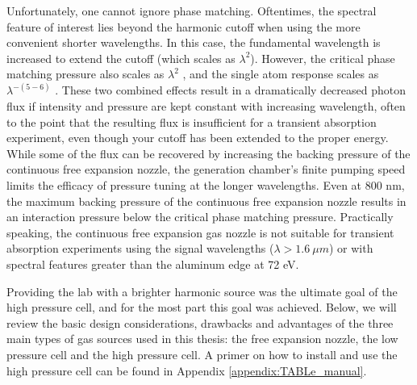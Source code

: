 Unfortunately, one cannot ignore phase matching. Oftentimes, the spectral feature of interest lies beyond the harmonic cutoff when using the more convenient shorter wavelengths. In this case, the fundamental wavelength is increased to extend the cutoff (which scales as $\lambda^2$). However, the critical phase matching pressure also scales as $\lambda^2$ \cite{popmintchevPhaseMatchingHigh2009}, and the single atom response scales as $\lambda^{-(5-6)}$ \cite{tateScalingWavePacketDynamics2007}. These two combined effects result in a dramatically decreased photon flux if intensity and pressure are kept constant with increasing wavelength, often to the point that the resulting flux is insufficient for a transient absorption experiment, even though your cutoff has been extended to the proper energy. While some of the flux can be recovered by increasing the backing pressure of the continuous free expansion nozzle, the generation chamber's finite pumping speed limits the efficacy of pressure tuning at the longer wavelengths. Even at 800 nm, the maximum backing pressure of the continuous free expansion nozzle results in an interaction pressure below the critical phase matching pressure. Practically speaking, the continuous free expansion gas nozzle is not suitable for transient absorption experiments using the signal wavelengths ($\lambda > 1.6 \ \mu m$) or with spectral features greater than the aluminum edge at 72 eV.

Providing the lab with a brighter harmonic source was the ultimate goal of the high pressure cell, and for the most part this goal was achieved. Below, we will review the basic design considerations, drawbacks and advantages of the three main types of gas sources used in this thesis: the free expansion nozzle, the low pressure cell and the high pressure cell. A primer on how to install and use the high pressure cell can be found in Appendix \ref{appendix:TABLe_manual}.

